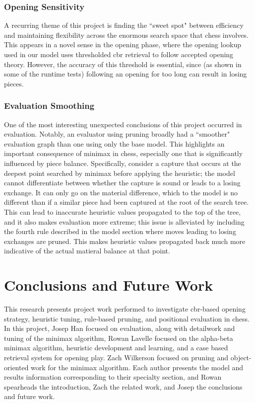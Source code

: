 \documentclass[letterpaper]{article}
\begin{document}
\subsubsection{Opening Sensitivity}
A recurring theme of this project is finding the ``sweet spot" between efficiency and maintaining flexibility across the enormous search space that chess involves.  This appears in a novel sense in the opening phase, where the opening lookup used in our model uses thresholded \acrshort{cbr} retrieval to follow accepted opening theory.  However, the accuracy of this threshold is essential, since (as shown in some of  the runtime tests) following an opening for too long can result in losing pieces.

\subsubsection{Evaluation Smoothing}
One of the most interesting unexpected conclusions of this project occurred in evaluation.  Notably, an evaluator using pruning broadly had a ``smoother" evaluation graph than one using only the base model.  This highlights an important consequence of minimax in chess, especially one that is significantly influenced by piece balance.  Specifically, consider a capture that occurs at the deepest point searched by minimax before applying the heuristic; the model cannot differentiate between whether the capture is sound or leads to a losing exchange.  It can only go on the material difference, which to the model is no different than if a similar piece had been captured at the root of the search tree.  This can lead to inaccurate heuristic values propagated to the top of the tree, and it also makes evaluation more extreme; this issue is alleviated by including the fourth rule described in the model section where moves leading to losing exchanges are pruned.  This makes heuristic values propagated back much more indicative of the actual matieral balance at that point.

\section{Conclusions and Future Work}
This research presents project work performed to investigate \acrshort{cbr}-based opening strategy, heuristic tuning, rule-based pruning, and positional evaluation in chess.  In this project, Josep Han focused on evaluation, along with detailwork and tuning of the minimax algorithm, Rowan Lavelle focused on the alpha-beta minimax algorithm, heuristic development and learning, and a case based retrieval system for opening play. Zach Wilkerson focused on pruning and object-oriented work for the minimax algorithm.  Each author presents the model and results information corresponding to their specialty section, and Rowan spearheads the introduction, Zach the related work, and Josep the conclusions and future work.



\end{document}
